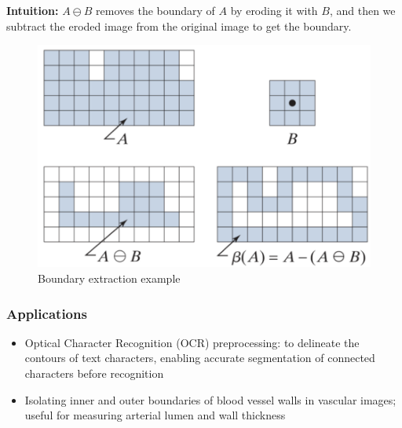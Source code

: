 \textbf{Intuition:} $A \ominus B$ removes the boundary of $A$ by eroding it with $B$, and then we subtract the eroded image from the original image to get the boundary.

\begin{figure}[H]
  \centering
  \includegraphics[width=\linewidth]{images/boundary_extraction.png}
  \caption{Boundary extraction example}
\end{figure}

\subsubsection*{Applications}

\begin{itemize}
  \item Optical Character Recognition (OCR) preprocessing: to delineate the contours of text characters, enabling accurate segmentation of connected characters before recognition
  \item Isolating inner and outer boundaries of blood vessel walls in vascular images; useful for measuring arterial lumen and wall thickness
\end{itemize}
